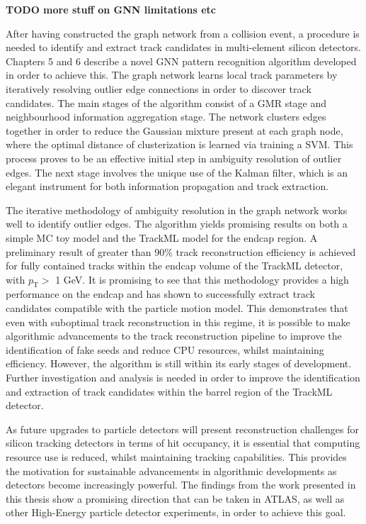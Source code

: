 
\textbf{TODO more stuff on GNN limitations etc}

After having constructed the graph network from a collision event, a procedure is needed to identify and extract track candidates in multi-element silicon detectors. Chapters 5 and 6 describe a novel GNN pattern recognition algorithm developed in order to achieve this. The graph network learns local track parameters by iteratively resolving outlier edge connections in order to discover track candidates. The main stages of the algorithm consist of a GMR stage and neighbourhood information aggregation stage. The network clusters edges together in order to reduce the Gaussian mixture present at each graph node, where the optimal distance of clusterization is learned via training a SVM. This process proves to be an effective initial step in ambiguity resolution of outlier edges. The next stage involves the unique use of the Kalman filter, which is an elegant instrument for both information propagation and track extraction. 

The iterative methodology of ambiguity resolution in the graph network works well to identify outlier edges. The algorithm yields promising results on both a simple MC toy model and the TrackML model for the endcap region. A preliminary result of greater than 90\% track reconstruction efficiency is achieved for fully contained tracks within the endcap volume of the TrackML detector, with $p_{\text{T}} >$ 1 GeV. It is promising to see that this methodology provides a high performance on the endcap and has shown to successfully extract track candidates compatible with the particle motion model. This demonstrates that even with suboptimal track reconstruction in this regime, it is possible to make algorithmic advancements to the track reconstruction pipeline to improve the identification of fake seeds and reduce CPU resources, whilst maintaining efficiency. However, the algorithm is still within its early stages of development. Further investigation and analysis is needed in order to improve the identification and extraction of track candidates within the barrel region of the TrackML detector.


As future upgrades to particle detectors will present reconstruction challenges for silicon tracking detectors in terms of hit occupancy, it is essential that computing resource use is reduced, whilst maintaining tracking capabilities. This provides the motivation for sustainable advancements in algorithmic developments as detectors become increasingly powerful. The findings from the work presented in this thesis show a promising direction that can be taken in ATLAS, as well as other High-Energy particle detector experiments, in order to achieve this goal. 
